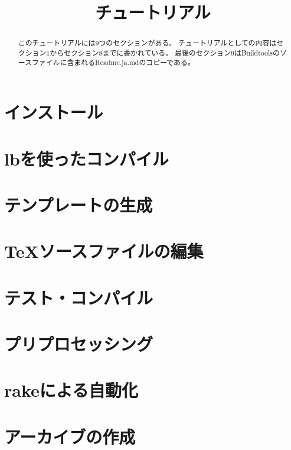 \documentclass{ltjsarticle}
\title{チュートリアル}
\author{} %
\begin{document}
\maketitle
\tableofcontents

\begin{abstract}
このチュートリアルには9つのセクションがある。
チュートリアルとしての内容はセクション1からセクション8までに書かれている。
最後のセクション9はBuildtoolsのソースファイルに含まれるReadme.ja.mdのコピーである。
\end{abstract}

\section{インストール}
  
\section{lbを使ったコンパイル}
  
\section{テンプレートの生成}
  
\section{TeXソースファイルの編集}
  
\section{テスト・コンパイル}
  
\section{プリプロセッシング}
  
\section{rakeによる自動化}
  
\section{アーカイブの作成}
  

\end{document}
